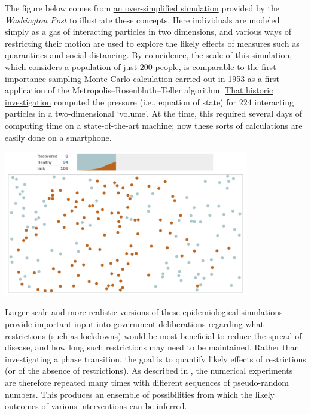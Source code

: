 The figure below comes from \href{https://www.washingtonpost.com/graphics/2020/world/corona-simulator/}{an over-simplified simulation} provided by the \textit{Washington Post} to illustrate these concepts.
Here individuals are modeled simply as a gas of interacting particles in two dimensions, and various ways of restricting their motion are used to explore the likely effects of measures such as quarantines and social distancing.
By coincidence, the scale of this simulation, which considers a population of just $200$ people, is comparable to the first importance sampling Monte Carlo calculation carried out in 1953 as a first application of the Metropolis--Rosenbluth--Teller algorithm.
\href{https://en.wikipedia.org/wiki/Equation_of_State_Calculations_by_Fast_Computing_Machines}{That historic investigation} computed the pressure (i.e., equation of state) for $224$ interacting particles in a two-dimensional `volume'.
At the time, this required several days of computing time on a state-of-the-art machine; now these sorts of calculations are easily done on a smartphone.

\begin{center}\includegraphics[width=0.8\textwidth]{figs/unit10_epidemic.pdf}\end{center}

Larger-scale and more realistic versions of these epidemiological simulations provide important input into government deliberations regarding what restrictions (such as lockdowns) would be most beneficial to reduce the spread of disease, and how long such restrictions may need to be maintained.
Rather than investigating a phase transition, the goal is to quantify likely effects of restrictions (or of the absence of restrictions).
As described in , the numerical experiments are therefore repeated many times with different sequences of pseudo-random numbers.
This produces an ensemble of possibilities from which the likely outcomes of various interventions can be inferred.


